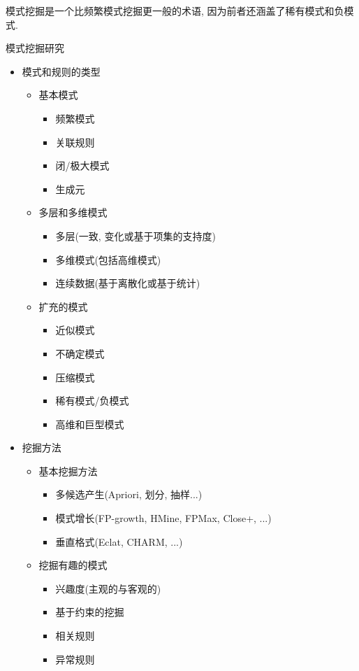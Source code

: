 \documentclass{article}
\begin{document}
模式挖掘是一个比频繁模式挖掘更一般的术语, 因为前者还涵盖了稀有模式和负模式.

\bigskip
模式挖掘研究
\begin{itemize}
	\item 模式和规则的类型
		\begin{itemize}
			\item 基本模式
				\begin{itemize}
					\item 频繁模式
					\item 关联规则
					\item 闭/极大模式
					\item 生成元
				\end{itemize}
			\item 多层和多维模式
				\begin{itemize}
					\item 多层(一致, 变化或基于项集的支持度)
					\item 多维模式(包括高维模式)
					\item 连续数据(基于离散化或基于统计)
				\end{itemize}
			\item 扩充的模式
				\begin{itemize}
					\item 近似模式
					\item 不确定模式
					\item 压缩模式
					\item 稀有模式/负模式
					\item 高维和巨型模式
				\end{itemize}
		\end{itemize}
	\item 挖掘方法
		\begin{itemize}
			\item 基本挖掘方法
				\begin{itemize}
					\item 多候选产生(Apriori, 划分, 抽样...)
					\item 模式增长(FP-growth, HMine, FPMax, Close+, ...)
					\item 垂直格式(Eclat, CHARM, ...)
				\end{itemize}
			\item 挖掘有趣的模式
				\begin{itemize}
					\item 兴趣度(主观的与客观的)
					\item 基于约束的挖掘
					\item 相关规则
					\item 异常规则

\end{itemize}
\end{itemize}
\end{itemize}
\end{document}
